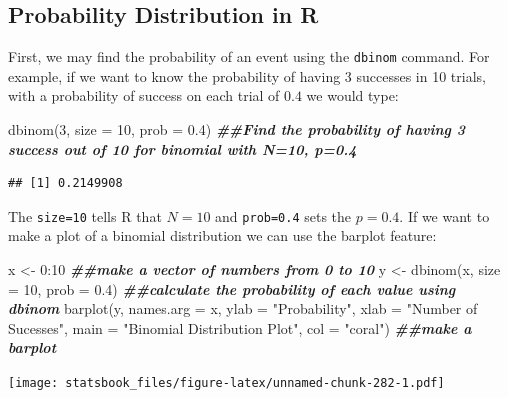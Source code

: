 \documentclass[
]{book}
\newenvironment{Shaded}{\begin{snugshade}}{\end{snugshade}}
\newcommand{\AttributeTok}[1]{\textcolor[rgb]{0.77,0.63,0.00}{#1}}
\newcommand{\DecValTok}[1]{\textcolor[rgb]{0.00,0.00,0.81}{#1}}
\newcommand{\DocumentationTok}[1]{\textcolor[rgb]{0.56,0.35,0.01}{\textbf{\textit{#1}}}}
\newcommand{\FloatTok}[1]{\textcolor[rgb]{0.00,0.00,0.81}{#1}}
\newcommand{\FunctionTok}[1]{\textcolor[rgb]{0.00,0.00,0.00}{#1}}
\newcommand{\NormalTok}[1]{#1}
\newcommand{\OtherTok}[1]{\textcolor[rgb]{0.56,0.35,0.01}{#1}}
\newcommand{\SpecialCharTok}[1]{\textcolor[rgb]{0.00,0.00,0.00}{#1}}
\newcommand{\StringTok}[1]{\textcolor[rgb]{0.31,0.60,0.02}{#1}}
\theoremstyle{definition}
\theoremstyle{definition}
\theoremstyle{definition}
\theoremstyle{definition}
\theoremstyle{remark}
\begin{document}
\hypertarget{probability-distribution-in-r}{%
\subsection{Probability Distribution in R}\label{probability-distribution-in-r}}

First, we may find the probability of an event using the \texttt{dbinom} command. For example, if we want to know the probability of having 3 successes in 10 trials, with a probability of success on each trial of \(0.4\) we would type:

\begin{Shaded}
\begin{Highlighting}[]
\FunctionTok{dbinom}\NormalTok{(}\DecValTok{3}\NormalTok{, }\AttributeTok{size =} \DecValTok{10}\NormalTok{, }\AttributeTok{prob =} \FloatTok{0.4}\NormalTok{)  }\DocumentationTok{\#\#Find the probability of having 3 success out of 10 for binomial with N=10, p=0.4}
\end{Highlighting}
\end{Shaded}

\begin{verbatim}
## [1] 0.2149908
\end{verbatim}

The \texttt{size=10} tells R that \(N=10\) and \texttt{prob=0.4} sets the \(p=0.4\). If we want to make a plot of a binomial distribution we can use the barplot feature:

\begin{Shaded}
\begin{Highlighting}[]
\NormalTok{x }\OtherTok{\textless{}{-}} \DecValTok{0}\SpecialCharTok{:}\DecValTok{10}  \DocumentationTok{\#\#make a vector of numbers from 0 to 10}
\NormalTok{y }\OtherTok{\textless{}{-}} \FunctionTok{dbinom}\NormalTok{(x, }\AttributeTok{size =} \DecValTok{10}\NormalTok{, }\AttributeTok{prob =} \FloatTok{0.4}\NormalTok{)  }\DocumentationTok{\#\#calculate the probability of each value using dbinom}
\FunctionTok{barplot}\NormalTok{(y, }\AttributeTok{names.arg =}\NormalTok{ x, }\AttributeTok{ylab =} \StringTok{"Probability"}\NormalTok{, }\AttributeTok{xlab =} \StringTok{"Number of Sucesses"}\NormalTok{, }\AttributeTok{main =} \StringTok{"Binomial Distribution Plot"}\NormalTok{,}
    \AttributeTok{col =} \StringTok{"coral"}\NormalTok{)  }\DocumentationTok{\#\#make a barplot}
\end{Highlighting}
\end{Shaded}

\texttt{[image: statsbook\_files/figure-latex/unnamed-chunk-282-1.pdf]}
\end{document}
